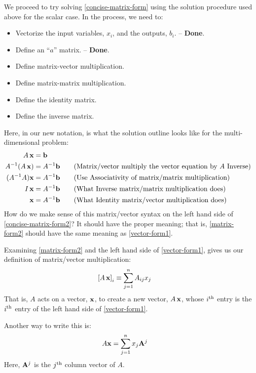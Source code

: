 \documentclass{article}
\begin{document}
We proceed to try solving \eqref{concise-matrix-form} using the solution 
procedure used above for the scalar case. In the process, we need to:
\begin{itemize}
    \item Vectorize the input variables, $x_i$, and the outputs, $b_i$. -- {\bf Done}.
    \item Define an ``$a$'' matrix. -- {\bf Done}.
    \item Define matrix-vector multiplication.
    \item Define matrix-matrix multiplication.
    \item Define the identity matrix.
    \item Define the inverse matrix.
\end{itemize}
Here, in our new notation, is what the solution outline looks like for the multi-dimensional problem:
\begin{align}
	A \, {\bf x} &= {\bf b} \label{concise-matrix-form2}\\
	A^{-1} ( A \, {\bf x} ) &= A^{-1} {\bf b} \quad \quad \text{(Matrix/vector multiply the vector equation by $A$ Inverse)} \label{inv-vec} \\
	(A^{-1} A) {\bf x} &= A^{-1} {\bf b} \quad \quad \text{(Use Associativity of matrix/matrix multiplication)} \label{assoc-vec} \\
	I \, {\bf x} &= A^{-1} {\bf b} \quad \quad \text{(What Inverse matrix/matrix multiplication does)} \\
	{\bf x} &= A^{-1} {\bf b} \quad \quad \text{(What Identity matrix/vector multiplication does)}
\end{align}
How do we make sense of this matrix/vector syntax on the left hand side of 
\eqref{concise-matrix-form2}? It should have
the proper meaning; that is, \eqref{matrix-form2}
should have the same meaning as \eqref{vector-form1}.

Examining \eqref{matrix-form2} and the left hand side of
\eqref{vector-form1}, gives us our definition of matrix/vector multiplication:
\begin{align}
  \left[A \, {\bf x}\right]_i &\equiv \sum_{j=1}^n A_{ij} x_j
                                         \label{matrix-vector-mult}
\end{align}
That is, $A$ acts on a vector, ${\bf x}$, to create a new vector, $A \, {\bf x}$,
whose $i^{\rm th}$ entry is the $i^{\rm th}$ entry of
the left hand side of \eqref{vector-form1}.

Another way to write this is:
\begin{align}
	A {\bf x} &= \sum_{j=1}^n x_j {\bf A}^j \label{mult-as-vec-combo}
\end{align}
Here, ${\bf A}^j$ is the $j^{\rm th}$ column vector of $A$. 
\end{document}
